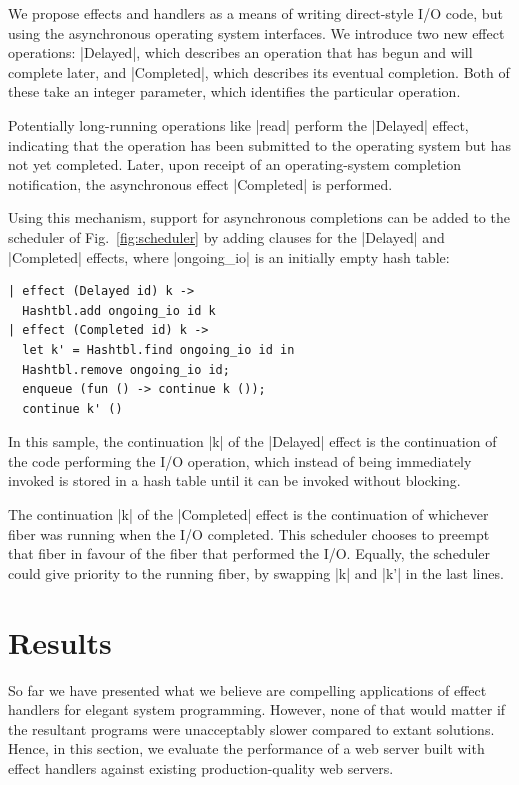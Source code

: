 \documentclass{llncs}
\begin{document}
We propose effects and handlers as a means of writing direct-style I/O
code, but using the asynchronous operating system interfaces. We
introduce two new effect operations: |Delayed|, which describes an
operation that has begun and will complete later, and |Completed|,
which describes its eventual completion. Both of these take an integer
parameter, which identifies the
particular operation.

Potentially long-running operations like |read| perform the |Delayed|
effect, indicating that the operation has been submitted to the
operating system but has not yet completed. Later, upon receipt of an
operating-system completion notification, the asynchronous effect
|Completed| is performed.

Using this mechanism, support for asynchronous completions can be
added to the scheduler of Fig.~\ref{fig:scheduler} by adding clauses
for the |Delayed| and |Completed| effects, where |ongoing_io| is an
initially empty hash table:
\begin{lstlisting}
| effect (Delayed id) k ->
  Hashtbl.add ongoing_io id k
| effect (Completed id) k ->
  let k' = Hashtbl.find ongoing_io id in
  Hashtbl.remove ongoing_io id;
  enqueue (fun () -> continue k ());
  continue k' ()
\end{lstlisting}
In this sample, the continuation |k| of the |Delayed| effect is the
continuation of the code performing the I/O operation, which instead
of being immediately invoked is stored in a hash table until it can be
invoked without blocking.

The continuation |k| of the |Completed| effect is the continuation of
whichever fiber was running when the I/O completed. This scheduler
chooses to preempt that fiber in favour of the fiber that performed the
I/O. Equally, the scheduler could give
priority to the running fiber, by swapping |k| and |k'|
in the last lines.

\section{Results}
\label{sec:results}

So far we have presented what we believe are compelling applications of effect
handlers for elegant system programming. However, none of that would matter if
the resultant programs were unacceptably slower compared to extant solutions.
Hence, in this section, we evaluate the performance of a web server built with
effect handlers against existing production-quality web servers.
\end{document}
